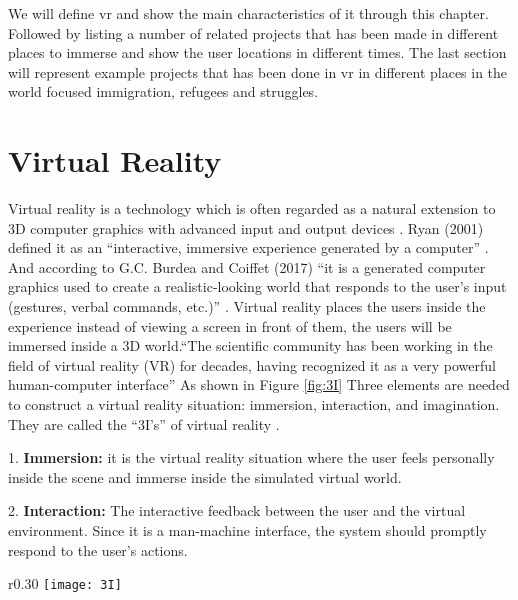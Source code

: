 We will define \acrfull{vr} and show the main characteristics of it through this chapter. Followed by listing a number of related projects that has been made in different places to immerse and show the user locations in different times. The last section will represent example projects that has been done in \acrshort{vr} in different places in the world focused immigration, refugees and struggles.   

\section{Virtual Reality} 
Virtual reality is a technology which is often regarded as a natural extension to 3D computer graphics with advanced input and output devices \citep{Jayaram1997}. Ryan (2001) defined it as an “interactive, immersive experience generated by a computer” \citep{Ryan2001}. And according to G.C. Burdea and Coiffet (2017) “it is a generated computer graphics used to create a realistic-looking world that responds to the user’s input (gestures, verbal commands, etc.)” \cite[p.20]{burdea2017virtual}. Virtual reality places the users inside the experience instead of viewing a screen in front of them, the users will be immersed inside a 3D world.“The scientific community has been working in the field of virtual reality (VR) for decades, having recognized it as a very powerful human-computer interface”\cite[p.19]{burdea2017virtual} As shown in Figure \ref{fig:3I} Three elements are needed to construct a virtual reality situation: immersion, interaction, and imagination. They are called the “3I’s” of virtual reality \citep{Hu2016,burdea2017virtual}.




1. \textbf{Immersion:} it is the virtual reality situation where the user feels personally inside the
scene and immerse inside the simulated virtual world.



2. \textbf{Interaction:} The interactive feedback between the user
and the virtual environment. Since it is a man-machine
interface, the system should promptly respond to the
user’s actions.


\begin{wrapfigure}{r}{0.30\textwidth} %
    \centering
    \texttt{[image: 3I]}
    \caption{The 3I's of Virtual Reality - © 2003 by John Wiley \& Sons Inc. All rights
reserved}
    \label{fig:3I}
\end{wrapfigure}

